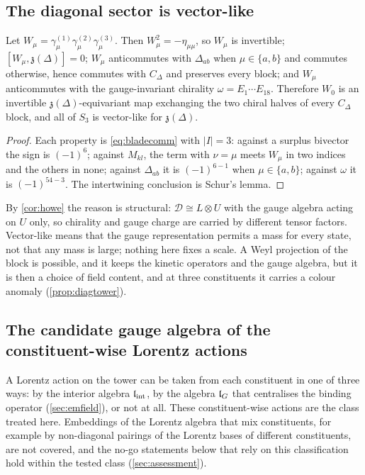 \subsection{The diagonal sector is vector-like}

\begin{theorem}
\label{thm:diagvectorlike}
Let $W_\mu=\gamma^{(1)}_\mu\gamma^{(2)}_\mu\gamma^{(3)}_\mu$. Then $W_\mu^2=-\eta_{\mu\mu}$, so $W_\mu$ is invertible; $[W_\mu,\mathfrak z(\Delta)]=0$;
$W_\mu$ anticommutes with $\Delta_{ab}$ when $\mu\in\{a,b\}$ and commutes otherwise, hence commutes with $C_\Delta$ and preserves every block;
and $W_\mu$ anticommutes with the gauge-invariant chirality $\omega=E_1\cdots E_{18}$. Therefore $W_0$ is an invertible
$\mathfrak z(\Delta)$-equivariant map exchanging the two chiral halves of every $C_\Delta$ block, and all of $S_3$ is vector-like for $\mathfrak z(\Delta)$.
\end{theorem}

\begin{proof}
Each property is \eqref{eq:bladecomm} with $|I|=3$: against a surplus bivector the sign is $(-1)^{6}$; against $M_{kl}$, the term with $\nu=\mu$
meets $W_\mu$ in two indices and the others in none; against $\Delta_{ab}$ it is $(-1)^{6-1}$ when $\mu\in\{a,b\}$; against $\omega$ it is
$(-1)^{54-3}$. The intertwining conclusion is Schur's lemma.
\end{proof}

By \cref{cor:howe} the reason is structural: $\mathcal D\cong L\otimes U$ with the gauge algebra acting on $U$ only, so chirality and gauge charge
are carried by different tensor factors. Vector-like means that the gauge representation permits a mass for every state, not that any mass is
large; nothing here fixes a scale. A Weyl projection of the block is possible, and it keeps the kinetic operators and the gauge algebra, but it
is then a choice of field content, and at three constituents it carries a colour anomaly (\cref{prop:diagtower}).

\subsection{The candidate gauge algebra of the constituent-wise Lorentz actions}

A Lorentz action on the tower can be taken from each constituent in one of three ways: by the interior algebra $\mathfrak l_{\rm int}$, by the algebra $\mathfrak l_G$
that centralises the binding operator (\cref{sec:emfield}), or not at all. These constituent-wise actions are the class treated here. Embeddings
of the Lorentz algebra that mix constituents, for example by non-diagonal pairings of the Lorentz bases of different constituents, are not
covered, and the no-go statements below that rely on this classification hold within the tested class (\cref{sec:assessment}).

